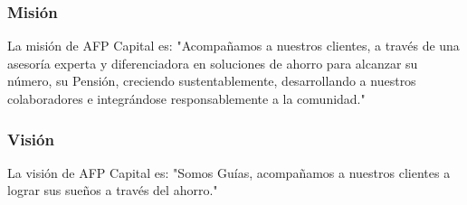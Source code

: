 \subsubsection{Misión}
La misión de AFP Capital es: "Acompañamos a nuestros clientes, a través de una asesoría experta y diferenciadora en soluciones de ahorro para alcanzar su número, su Pensión, creciendo sustentablemente, desarrollando a nuestros colaboradores e integrándose responsablemente a la comunidad." \cite{afpcapital}

\subsubsection{Visión}
La visión de AFP Capital es: "Somos Guías, acompañamos a nuestros clientes a lograr sus sueños a través del ahorro." \cite{afpcapital}